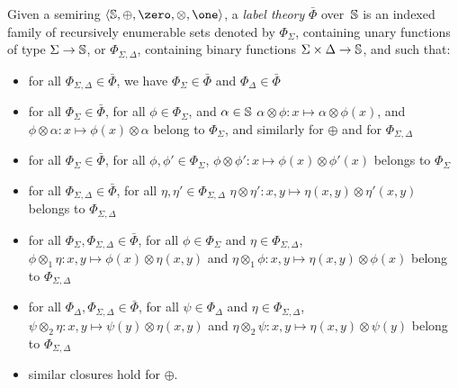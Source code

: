 Given a semiring $\< \Semiring, \oplus, \zero, \otimes, \one>$,
a \emph{label theory} $\bar\Phi$ over~$\mathbb{S}$
is an indexed family of recursively enumerable sets denoted by
$\Phi_\Sigma$, %
containing unary functions of type $\Sigma \to \mathbb{S}$, %
or $\Phi_{\Sigma, \Delta}$, containing binary functions $\Sigma \times \Delta \to \mathbb{S}$,
and such that:
\begin{itemize}
\item %
     for all $\Phi_{\Sigma, \Delta} \in \bar\Phi$, we have
     $\Phi_{\Sigma} \in \bar\Phi$ and $\Phi_{\Delta} \in \bar\Phi$
%
%
\item %
      for all $\Phi_{\Sigma} \in \bar\Phi$, 
      for all $\phi \in \Phi_\Sigma$, and $\alpha \in \mathbb{S}$ 
      $\alpha \otimes \phi : x \mapsto \alpha \otimes \phi(x)$,
      and $\phi \otimes \alpha : x \mapsto \phi(x) \otimes \alpha$  %
      belong to $\Phi_\Sigma$, and similarly for $\oplus$
      and for $\Phi_{\Sigma, \Delta}$
%
\item %
      for all $\Phi_{\Sigma} \in \bar\Phi$, 
      for all $\phi, \phi' \in \Phi_\Sigma$,
      $\phi \otimes \phi': x \mapsto \phi(x) \otimes \phi'(x)$ belongs to $\Phi_\Sigma$
%
\item %
	  for all $\Phi_{\Sigma, \Delta} \in \bar\Phi$,
      for all $\eta, \eta' \in \Phi_{\Sigma, \Delta}$
      $\eta \otimes \eta': x, y \mapsto \eta(x, y) \otimes \eta'(x, y)$ belongs to $\Phi_{\Sigma, \Delta}$
%
\item %
      for all $\Phi_{\Sigma}, \Phi_{\Sigma, \Delta} \in \bar\Phi$,
      for all $\phi \in \Phi_\Sigma$ and $\eta \in \Phi_{\Sigma, \Delta}$,
      $\phi \otimes_1 \eta: x, y \mapsto \phi(x) \otimes \eta(x, y)$ and
      $\eta \otimes_1 \phi: x, y \mapsto \eta(x, y) \otimes \phi(x)$
      belong to $\Phi_{\Sigma, \Delta}$
%
\item %
      for all $\Phi_{\Delta}, \Phi_{\Sigma, \Delta} \in \bar\Phi$,
      for all $\psi \in \Phi_\Delta$ and $\eta \in \Phi_{\Sigma, \Delta}$,
      $\psi \otimes_2 \eta: x, y \mapsto \psi(y) \otimes \eta(x, y)$ and
      $\eta \otimes_2 \psi: x, y \mapsto \eta(x, y) \otimes \psi(y)$
      belong to $\Phi_{\Sigma, \Delta}$
%
\item %
      similar closures hold for $\oplus$.
\end{itemize}

